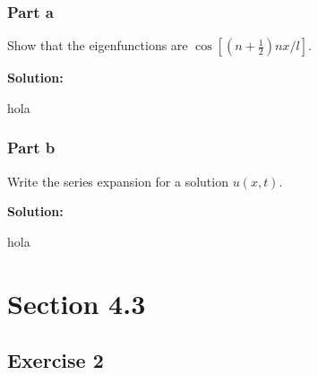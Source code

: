 \documentclass{article}
\begin{document}
\subsubsection{Part a}
Show that the eigenfunctions are $\cos[(n+\frac{1}{2})nx/l]$.

\textbf{Solution:}

hola
\subsubsection{Part b}
Write the series expansion for a solution $u(x,t)$.

\textbf{Solution:}

hola
\section{Section 4.3}
\subsection{Exercise 2}
\end{document}
